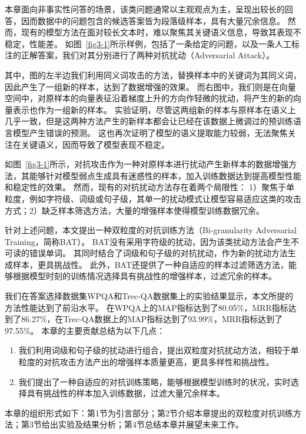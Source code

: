 本章面向非事实性问答的场景，该类问题通常以主观观点为主，呈现出较长的回答，因而数据中的问题包含的候选答案皆为段落级样本，具有大量冗余信息。
然而，现有的模型方法在面对较长文本时，难以聚焦其关键语义信息，导致其表现不稳定，性能差。
如图~\ref{fig3-1}所示样例，包括了一条给定的问题，以及一条人工标注的正解答案，我们对其分别进行了两种对抗扰动（Adversarial Attack）。



其中，图的左半边我们利用同义词攻击的方法，替换样本中的关键词为其同义词，因此产生了一组新的样本，达到了数据增强的效果。
而右图中，我们则是在向量空间中，对原样本的向量表征沿着梯度上升的方向作轻微的扰动，将产生的新的向量表示也作为一组新的样本。
实验证明，尽管这两组新的样本与原样本在语义上几乎一致，但是这两种方法产生的新样本都会让已经在该数据上微调过的预训练语言模型产生错误的预测。
这也再次证明了模型的语义提取能力较弱，无法聚焦关注在关键语义，因而导致了模型表现不稳定。

如图~\ref{fig3-1}所示，对抗攻击作为一种对原样本进行扰动产生新样本的数据增强方法，其能够针对模型弱点生成具有迷惑性的样本，加入训练数据达到提高模型性能和稳定性的效果。
然而，现有的对抗扰动方法存在着两个局限性：
1）聚焦于单粒度，例如字符级、词级或句子级，其单一的扰动模式让模型容易适应这类的攻击方式；2）缺乏样本筛选方法，大量的增强样本使得模型训练数据冗余。

针对上述问题，本文提出一种双粒度的对抗训练方法（Bi-granularity Adversarial Training，简称BAT）。
BAT没有采用字符级的扰动，因为该类扰动方法会产生不可读的错误单词。
其同时结合了词级和句子级的对抗扰动，作为新的扰动方法生成样本，更具挑战性。
此外，BAT还提供了一种自适应的样本过滤筛选方法，能够根据模型时刻的训练情况选择具有挑战性的增强样本，过滤冗余的样本。

我们在答案选择数据集WPQA和Trec-QA数据集上的实验结果显示，本文所提的方法性能达到了前沿水平。
在WPQA上的MAP指标达到了80.05\%，MRR指标达到了86.27\%，在Trec-QA数据上的MAP指标达到了93.99\%，MRR指标达到了97.55\%。
本章的主要贡献总结为以下几点：

\begin{enumerate}
    \item 
    我们利用词级和句子级的扰动进行组合，提出双粒度对抗扰动方法，相较于单粒度的对抗攻击方法产出的增强样本质量更高，更具多样性和挑战性。
    \item 
    我们提出了一种自适应的对抗训练策略，能够根据模型训练时的状况，实时选择具有挑战性的样本加入训练数据，过滤大量冗余样本。
\end{enumerate}

本章的组织形式如下：第1节为引言部分；第2节介绍本章提出的双粒度对抗训练方法；第3节给出实验及结果分析；第4节总结本章并展望未来工作。










